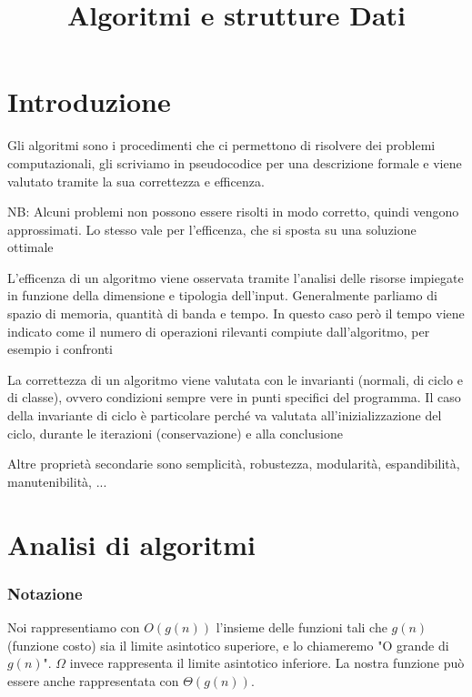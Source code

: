 \documentclass[12pt, a4paper]{article}
\title{Algoritmi e strutture Dati}
\begin{document}
\section{Introduzione}
Gli algoritmi sono i procedimenti che ci permettono di risolvere dei problemi computazionali, gli scriviamo in 
pseudocodice per una descrizione formale e viene valutato tramite la sua correttezza e efficenza. 

NB: Alcuni problemi non possono essere risolti in modo corretto, quindi vengono approssimati. Lo stesso vale per
l'efficenza, che si sposta su una soluzione ottimale

L'efficenza di un algoritmo viene osservata tramite l'analisi delle risorse impiegate in funzione della dimensione
e tipologia dell'input. Generalmente parliamo di spazio di memoria, quantità di banda e tempo. In questo caso
però il tempo viene indicato come il numero di operazioni rilevanti compiute dall'algoritmo, per esempio i
confronti

La correttezza di un algoritmo viene valutata con le invarianti (normali, di ciclo e di classe), ovvero condizioni
sempre vere in punti specifici del programma. Il caso della invariante di ciclo è particolare perché va valutata
all'inizializzazione del ciclo, durante le iterazioni (conservazione) e alla conclusione

Altre proprietà secondarie sono semplicità, robustezza, modularità, espandibilità, manutenibilità, ...

\newpage
\section{Analisi di algoritmi}
\subsubsection*{Notazione}
Noi rappresentiamo con $O(g(n))$ l'insieme delle funzioni tali che $g(n)$ (funzione costo) sia il limite asintotico
superiore, e lo chiameremo "O grande di $g(n)$". $\Omega$ invece rappresenta il limite asintotico inferiore.
La nostra funzione può essere anche rappresentata con $\Theta(g(n))$.
\end{document}
